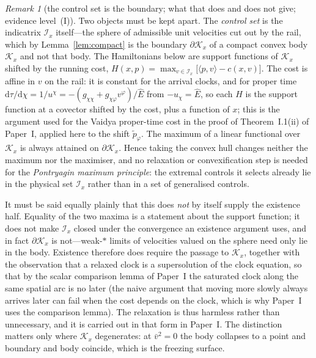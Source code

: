\documentclass[12pt]{iopart}
\theoremstyle{plain}
\theoremstyle{definition}
\theoremstyle{remark}
\newtheorem{remark}[proposition]{Remark}
\newcommand{\Ehat}{\hat E}
\newcommand{\dd}{\mathrm{d}}
\begin{document}
\begin{remark}[the control set is the boundary; what that does and does not
give; evidence level~(I)]
\label{rmk:indicatrix}
Two objects must be kept apart. The \emph{control set} is the indicatrix
$\mathcal I_x$ itself---the sphere of admissible unit velocities cut out by the
rail, which by Lemma~\ref{lem:compact} is the boundary $\partial\mathcal K_x$ of
a compact convex body $\mathcal K_x$ and not that body. The Hamiltonians below
are support functions of $\mathcal K_x$ shifted by the running cost,
$H(x,p)=\max_{v\in\mathcal I_x}\big[\langle p,v\rangle-c(x,v)\big]$. The cost is affine in
$v$ on the rail: it is constant for the arrival clocks, and for proper time
$\dd\tau/\dd\chi=1/u^\chi=-(g_{\chi\chi}+g_{\chi\varphi}v^\varphi)/\Ehat$ from
$-u_\chi=\Ehat$, so each $H$ is the support function at a covector shifted by the cost,
plus a function of $x$; this is the argument used for the Vaidya proper-time cost in the
proof of Theorem~I.1(ii) of Paper~I, applied here to the shift $\tilde p_\varphi$. The maximum of a linear functional over
$\mathcal K_x$ is always attained on $\partial\mathcal K_x$. Hence taking the
convex hull changes neither the maximum nor the maximiser, and no relaxation or
convexification step is needed for the \emph{Pontryagin maximum principle}: the
extremal controls it selects already lie in the physical set $\mathcal I_x$
rather than in a set of generalised controls.

It must be said equally plainly that this does \emph{not} by itself supply the
existence half. Equality of the two maxima is a statement about the support
function; it does not make $\mathcal I_x$ closed under the convergence an
existence argument uses, and in fact $\partial\mathcal K_x$ is not---weak-$*$
limits of velocities valued on the sphere need only lie in the body. Existence
therefore does require the passage to $\mathcal K_x$, together with the
observation that a relaxed clock is a supersolution of the clock equation, so that by the
scalar comparison lemma of Paper~I the saturated clock along the same spatial arc is no
later (the naive argument that moving more slowly always arrives later can fail when the
cost depends on the clock, which is why Paper~I uses the comparison lemma). The
relaxation is thus harmless rather than unnecessary, and it is carried out in
that form in Paper~I. The distinction matters only where $\mathcal K_x$
degenerates: at $\bar v^2=0$ the body collapses to a point and boundary and body
coincide, which is the freezing surface.
\end{remark}
\end{document}
